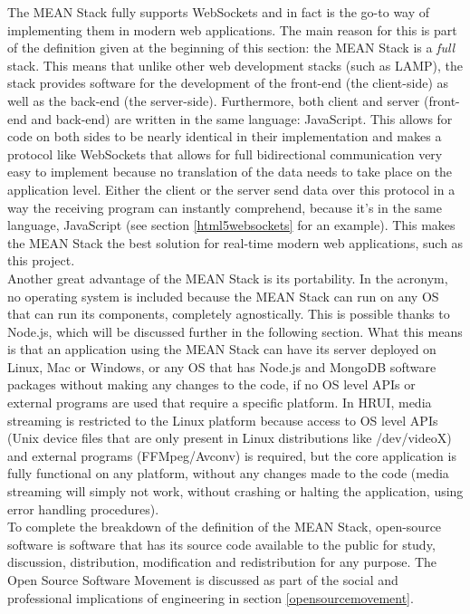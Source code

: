The MEAN Stack fully supports WebSockets and in fact is the go-to way of implementing them in modern web applications. The
main reason for this is part of the definition given at the beginning of this section: the MEAN Stack is a \textit{full}
stack. This means that unlike other web development stacks (such as LAMP), the stack provides software for the development of
the front-end (the client-side) as well as the back-end (the server-side). Furthermore, both client and server (front-end and
back-end) are written in the same language: JavaScript. This allows for code on both sides to be nearly identical in their
implementation and makes a protocol like WebSockets that allows for full bidirectional communication very easy to implement
because no translation of the data needs to take place on the application level. Either the client or the server send data
over this protocol in a way the receiving program can instantly comprehend, because it's in the same language, JavaScript  
(see section \ref{html5websockets} for an example). This makes the MEAN Stack the best solution for real-time modern web
applications, such as this project.\\

Another great advantage of the MEAN Stack is its portability. In the acronym, no operating system is included because the MEAN
Stack can run on any OS that can run its components, completely agnostically. This is possible thanks to Node.js, which will
be discussed further in the following section. What this means is that an application using the MEAN Stack can have its
server deployed on Linux, Mac or Windows, or any OS that has Node.js and MongoDB software packages without making any changes
to the code, if no OS level APIs or external programs are used that require a specific platform. In HRUI, media streaming is
restricted to the Linux platform because access to OS level APIs (Unix device files that are only present in Linux
distributions like /dev/videoX) and external programs (FFMpeg/Avconv) is required, but the core application is fully
functional on any platform, without any changes made to the code (media streaming will simply not work, without crashing or
halting the application, using error handling procedures).\\

To complete the breakdown of the definition of the MEAN Stack, open-source software is software that has its source code
available to the public for study, discussion, distribution, modification and redistribution for any purpose. The Open Source
Software Movement is discussed as part of the social and professional implications of engineering in section \ref{opensourcemovement}.\\

